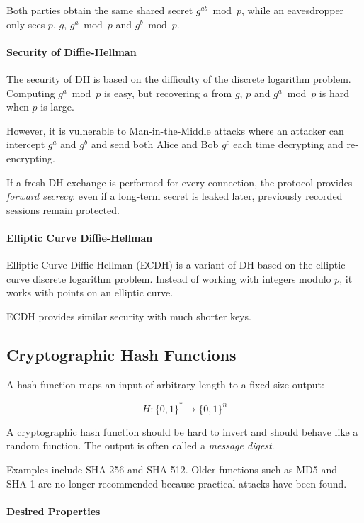 Both parties obtain the same shared secret $g^{ab} \bmod p$, while an
eavesdropper only sees $p$, $g$, $g^a \bmod p$ and $g^b \bmod p$.

\paragraph{Security of Diffie-Hellman}

The security of DH is based on the difficulty of the discrete logarithm
problem. Computing $g^a \bmod p$ is easy, but recovering $a$ from
$g$, $p$ and $g^a \bmod p$ is hard when $p$ is large.

However, it is vulnerable to Man-in-the-Middle attacks where an attacker can intercept $g^a$ and $g^b$ and send both Alice and Bob $g^c$ each time decrypting and re-encrypting.

If a fresh DH exchange is performed for every connection, the protocol
provides \emph{forward secrecy}: even if a long-term secret is leaked
later, previously recorded sessions remain protected.

\paragraph{Elliptic Curve Diffie-Hellman}

Elliptic Curve Diffie-Hellman (ECDH) is a variant of DH based on the
elliptic curve discrete logarithm problem. Instead of working with
integers modulo $p$, it works with points on an elliptic curve.

ECDH provides similar security with much shorter keys. 

\subsection{Cryptographic Hash Functions}

A hash function maps an input of arbitrary length to a fixed-size output:

\[
H : {\{0,1\}}^* \rightarrow {\{0,1\}}^n
\]

A cryptographic hash function should be hard to invert and should behave
like a random function. The output is often called a \emph{message
digest}.

Examples include SHA-256 and SHA-512. Older functions such as MD5 and
SHA-1 are no longer recommended because practical attacks have been
found.

\paragraph{Desired Properties}

